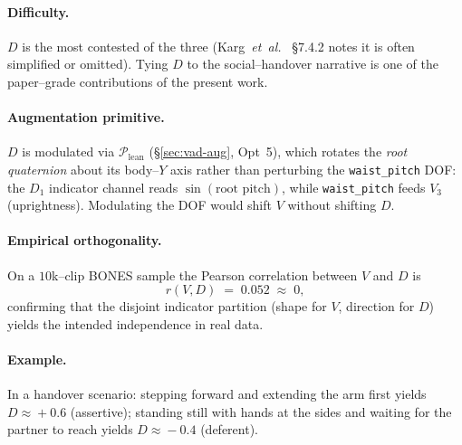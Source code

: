 \paragraph{Difficulty.}
$D$ is the most contested of the three
(Karg~\textit{et~al.}~\cite{karg2013body} \S7.4.2 notes it is often
simplified or omitted). Tying $D$ to the social--handover narrative is
one of the paper--grade contributions of the present work.

\paragraph{Augmentation primitive.}
$D$ is modulated via $\mathcal{P}_{\text{lean}}$ (\S\ref{sec:vad-aug},
Opt~5), which rotates the \emph{root quaternion} about its body--$Y$ axis
rather than perturbing the \texttt{waist\_pitch} DOF: the $D_1$
indicator channel reads $\sin(\text{root pitch})$, while
\texttt{waist\_pitch} feeds $V_3$ (uprightness). Modulating the DOF would
shift $V$ without shifting $D$.

\paragraph{Empirical orthogonality.}
On a $10$k--clip BONES sample the Pearson correlation between $V$ and
$D$ is
\begin{equation}
  r(V, D) \;=\; 0.052 \;\approx\; 0,
\end{equation}
confirming that the disjoint indicator partition (shape for $V$,
direction for $D$) yields the intended independence in real data.

\paragraph{Example.}
In a handover scenario: stepping forward and extending the arm first
yields $D\!\approx\!+0.6$ (assertive); standing still with hands at the
sides and waiting for the partner to reach yields $D\!\approx\!-0.4$
(deferent).

